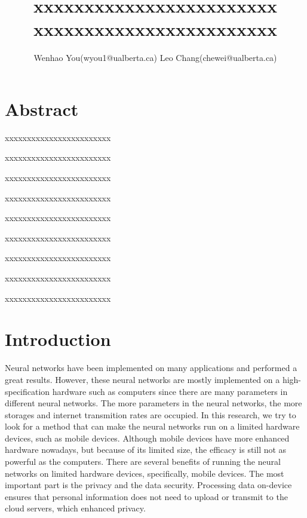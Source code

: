 \documentclass{article}
\title{xxxxxxxxxxxxxxxxxxxxxxxx xxxxxxxxxxxxxxxxxxxxxxxx}
\author{Wenhao You(wyou1@ualberta.ca) Leo Chang(chewei@ualberta.ca)}
\date{}
\begin{document}
	\maketitle
	
	
	
	
	
	
	\section*{Abstract}
	
	xxxxxxxxxxxxxxxxxxxxxxxx
	
	xxxxxxxxxxxxxxxxxxxxxxxx
	
	xxxxxxxxxxxxxxxxxxxxxxxx
	
	xxxxxxxxxxxxxxxxxxxxxxxx
	
	xxxxxxxxxxxxxxxxxxxxxxxx
	
	xxxxxxxxxxxxxxxxxxxxxxxx
	
	xxxxxxxxxxxxxxxxxxxxxxxx
	
	xxxxxxxxxxxxxxxxxxxxxxxx
	
	xxxxxxxxxxxxxxxxxxxxxxxx
	
	\section*{Introduction}
	
Neural networks have been implemented on many applications and performed a great results. However, these neural networks are mostly implemented on a high-specification hardware such as computers since there are many parameters in different neural networks. The more parameters in the neural networks, the more storages and internet transmition rates are occupied. In this research, we try to look for a method that can make the neural networks run on a limited hardware devices, such as mobile devices. Although mobile devices have more enhanced hardware nowadays, but because of its limited size, the efficacy is still not as powerful as the computers. There are several benefits of running the neural networks on limited hardware devices, specifically, mobile devices. The most important part is the privacy and the data security. Processing data on-device ensures that personal information does not need to upload or transmit to the cloud servers, which enhanced privacy. 
\end{document}
